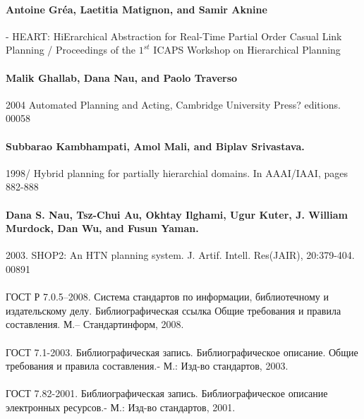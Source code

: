 \documentclass{article}
\begin{document}
\paragraph{Antoine Gréa, Laetitia Matignon, and Samir Aknine}
 - HEART: HiErarchical Abstraction for Real-Time Partial Order Casual Link Planning / Proceedings of the $1^{st}$ ICAPS Workshop on Hierarchical Planning
\paragraph{Malik Ghallab, Dana Nau, and Paolo Traverso} 2004 Automated Planning and Acting, Cambridge University Press? editions. 00058
\paragraph{Subbarao Kambhampati, Amol Mali, and Biplav Srivastava.} 1998/ Hybrid planning for partially hierarchial domains. In AAAI/IAAI, pages 882-888
\paragraph{Dana S. Nau, Tsz-Chui Au, Okhtay Ilghami, Ugur Kuter, J. William Murdock, Dan Wu, and Fusun Yaman.} 2003. SHOP2: An HTN planning system. J. Artif. Intell. Res(JAIR), 20:379-404. 00891
\paragraph{}ГОСТ Р 7.0.5–2008. Система стандартов по информации, библиотечному и
издательскому делу. Библиографическая ссылка Общие требования и
правила составления. М.– Стандартинформ, 2008.
\paragraph{}ГОСТ 7.1-2003. Библиографическая запись. Библиографическое описание.
Общие требования и правила составления.- М.: Изд-во стандартов, 2003.
\paragraph{}ГОСТ 7.82-2001. Библиографическая запись. Библиографическое описание
электронных ресурсов.- М.: Изд-во стандартов, 2001.
\end{document}
